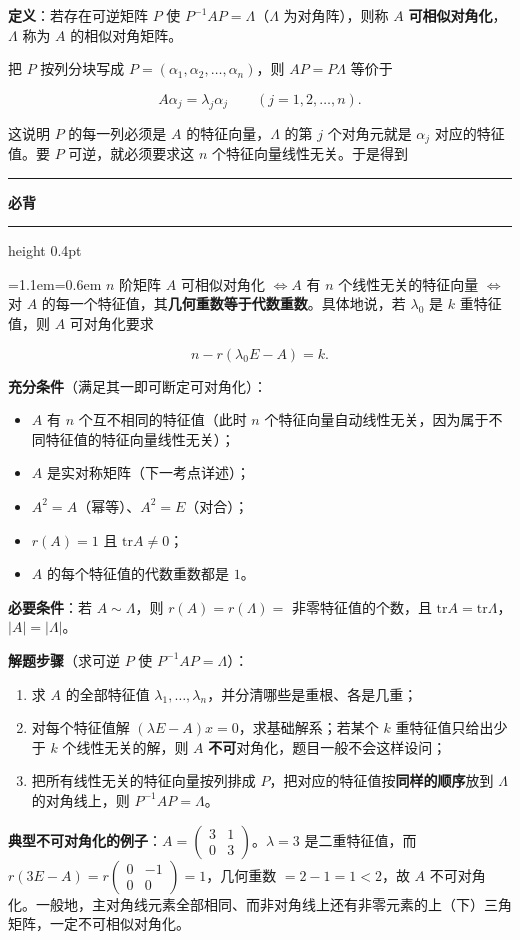 \documentclass[11pt,openany,UTF8]{ctexbook}
\newcommand{\callouthead}[2]{%
  \par\addvspace{7pt}\noindent
  {\color{#1}\rule[-0.15em]{3pt}{1.05em}}\hspace{0.5em}%
  {\bfseries\color{#1}#2}\par\nobreak\vspace{-0.35em}%
  {\color{rulesep}\hrule height 0.4pt}\nobreak\vspace{0.45em}%
  \begingroup\small\setlength{\parindent}{0pt}%
  \leftskip=1.1em\rightskip=0.6em\noindent\ignorespaces}
\newcommand{\calloutend}{\par\endgroup\addvspace{7pt}}
\newenvironment{callkey}[1]{\callouthead{keybar}{#1}}{\calloutend}
\begin{document}
\textbf{定义}：若存在可逆矩阵 $P$ 使 $P^{-1}AP=\Lambda$（$\Lambda$ 为对角阵），则称 $A$ \textbf{可相似对角化}，$\Lambda$ 称为 $A$ 的相似对角矩阵。

把 $P$ 按列分块写成 $P=(\alpha_1,\alpha_2,\dots,\alpha_n)$，则 $AP=P\Lambda$ 等价于

\[A\alpha_j=\lambda_j\alpha_j\qquad(j=1,2,\dots,n).\]

这说明 $P$ 的每一列必须是 $A$ 的特征向量，$\Lambda$ 的第 $j$ 个对角元就是 $\alpha_j$ 对应的特征值。要 $P$ 可逆，就必须要求这 $n$ 个特征向量线性无关。于是得到

\begin{callkey}{必背}
$n$ 阶矩阵 $A$ 可相似对角化 $\iff A$ 有 $n$ 个线性无关的特征向量 $\iff$ 对 $A$ 的每一个特征值，其\textbf{几何重数等于代数重数}。具体地说，若 $\lambda_0$ 是 $k$ 重特征值，则 $A$ 可对角化要求

\[n-r(\lambda_0E-A)=k .\]

\end{callkey}

\textbf{充分条件}（满足其一即可断定可对角化）：

\begin{itemize}
\item $A$ 有 $n$ 个互不相同的特征值（此时 $n$ 个特征向量自动线性无关，因为属于不同特征值的特征向量线性无关）；
\item $A$ 是实对称矩阵（下一考点详述）；
\item $A^2=A$（幂等）、$A^2=E$（对合）；
\item $r(A)=1$ 且 $\mathrm{tr}A\neq0$；
\item $A$ 的每个特征值的代数重数都是 $1$。
\end{itemize}
\textbf{必要条件}：若 $A\sim\Lambda$，则 $r(A)=r(\Lambda)=$ 非零特征值的个数，且 $\mathrm{tr}A=\mathrm{tr}\Lambda$，$\vert A\vert=\vert\Lambda\vert$。

\textbf{解题步骤}（求可逆 $P$ 使 $P^{-1}AP=\Lambda$）：

\begin{enumerate}
\item 求 $A$ 的全部特征值 $\lambda_1,\dots,\lambda_n$，并分清哪些是重根、各是几重；
\item 对每个特征值解 $(\lambda E-A)x=0$，求基础解系；若某个 $k$ 重特征值只给出少于 $k$ 个线性无关的解，则 $A$ \textbf{不可}对角化，题目一般不会这样设问；
\item 把所有线性无关的特征向量按列排成 $P$，把对应的特征值按\textbf{同样的顺序}放到 $\Lambda$ 的对角线上，则 $P^{-1}AP=\Lambda$。
\end{enumerate}
\textbf{典型不可对角化的例子}：$A=\begin{pmatrix}3&1\\0&3\end{pmatrix}$。$\lambda=3$ 是二重特征值，而 $r(3E-A)=r\begin{pmatrix}0&-1\\0&0\end{pmatrix}=1$，几何重数 $=2-1=1<2$，故 $A$ 不可对角化。一般地，主对角线元素全部相同、而非对角线上还有非零元素的上（下）三角矩阵，一定不可相似对角化。
\end{document}
